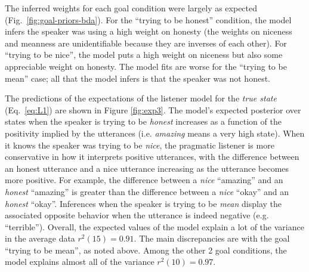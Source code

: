 \documentclass[10pt,letterpaper]{article}
\newcommand{\ndg}[1]{\textcolor{Green}{[ndg: #1]}}
\newcommand{\mht}[1]{\textcolor{DarkOrange}{[mht: #1]}}
\begin{document}
%




The inferred weights for each goal condition were largely as expected (Fig.~\ref{fig:goal-priors-bda}).
For the ``trying to be honest'' condition, the model infers the speaker was using a high weight on honesty (the weights on niceness and meanness are unidentifiable because they are inverses of each other).
For ``trying to be nice'', the model puts a high weight on niceness but also some appreciable weight on honesty.
The model fits are worse for the ``trying to be mean'' case; all that the model infers is that the speaker was not honest.

The predictions of the expectations of the listener model for the \emph{true state} (Eq.~\ref{eq:L1}) are shown in Figure \ref{fig:exp3}.
The model's expected posterior over states when the speaker is trying to be \emph{honest} increases as a function of the positivity implied by the utterances (i.e. \emph{amazing} means a very high state).
When it knows the speaker was trying to be \emph{nice}, the pragmatic listener is more conservative in how it interprets positive utterances, with the difference between an honest utterance and a nice utterance increasing as the utterance becomes more positive. 
For example, the difference between a \emph{nice} ``amazing'' and an \emph{honest} ``amazing'' is greater than the difference between a \emph{nice} ``okay'' and an \emph{honest} ``okay''.
Inferences when the speaker is trying to be \emph{mean} display the associated opposite behavior when the utterance is indeed negative (e.g. ``terrible'').
Overall, the expected values of the model explain a lot of the variance in the average data $r^2(15) = 0.91$.
The main discrepancies are with the goal ``trying to be mean'', as noted above.
Among the other 2 goal conditions, the model explains almost all of the variance $r^2(10) = 0.97$.
\end{document}
